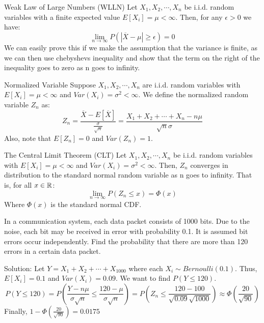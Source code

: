 \begin{thm}{Weak Law of Large Numbers (WLLN)}{}
Let \(X_1, X_2, \cdots, X_n\) be i.i.d. random variables with a finite expected value \(E[X_i] = \mu < \infty\). Then, for any \(\epsilon > 0\) we have:
\begin{equation*}
  \lim_{n \to \infty}P(|\overline{X} - \mu | \geq \epsilon) = 0
\end{equation*}
We can easily prove this if we make the assumption that the variance is finite, as we can then use chebyshevs inequality and show that the term on the right of the inequality goes to zero as n goes to infinity.
\end{thm}
\begin{defn}{Normalized Variable}{}
Suppose \(X_1,X_2,\cdots,X_n\) are i.i.d. random variables with \(E[X_i] = \mu < \infty\) and \(Var(X_i) = \sigma^2 < \infty\). We define the normalized random variable \(Z_n\) as:
\begin{equation*}
  Z_n = \frac{\overline{X} - E[\overline{X}]}{\frac{\sigma}{\sqrt{n}}} = \frac{X_1 + X_2 + \cdots + X_n - n\mu }{\sqrt{n}\sigma}
\end{equation*}
Also, note that \(E[Z_n] = 0\) and \(Var(Z_n) = 1\).
\end{defn}
\begin{thm}{The Central Limit Theorem (CLT)}{}
Let \(X_1,X_2,\cdots,X_n\) be i.i.d. random variables with \(E[X_i] = \mu < \infty\) and \(Var(X_i) = \sigma^2 < \infty\). Then, \(Z_n\) converges in distribution to the standard normal random variable as n goes to infinity. That is, for all \(x \in {\mathbb R}\):
\begin{equation*}
  \lim_{n\to\infty} P(Z_n \leq x) = \Phi(x)
\end{equation*}
Where \(\Phi(x)\) is the standard normal CDF.

\end{thm}
\begin{exmp}{}{}
In a communication system, each data packet consists of 1000 bits. Due to the noise, each bit may be received in error with probability 0.1. It is assumed bit errors occur independently. Find the probability that there are more than 120 errors in a certain data packet. \newline 

Solution: Let \(Y = X_1 + X_2 + \cdots + X_1000\) where each \(X_i \sim Bernoulli(0.1)\). Thus, \(E[X_i] = 0.1\) and \(Var(X_i) = 0.09\). We want to find \(P(Y \leq 120)\). 
\begin{equation*}
  P(Y \leq 120) 
  = P(\frac{Y - n\mu}{\sigma \sqrt{n}} \leq \frac{120 - \mu}{\sigma \sqrt{n}}) 
  = P(Z_n \leq \frac{120 - 100}{\sqrt{0.09} \sqrt{1000}})
  \approx \Phi(\frac{20}{\sqrt{90}})
\end{equation*}
Finally, \(1 - \Phi(\frac{20}{\sqrt{90}}) = 0.0175\)

\end{exmp}

